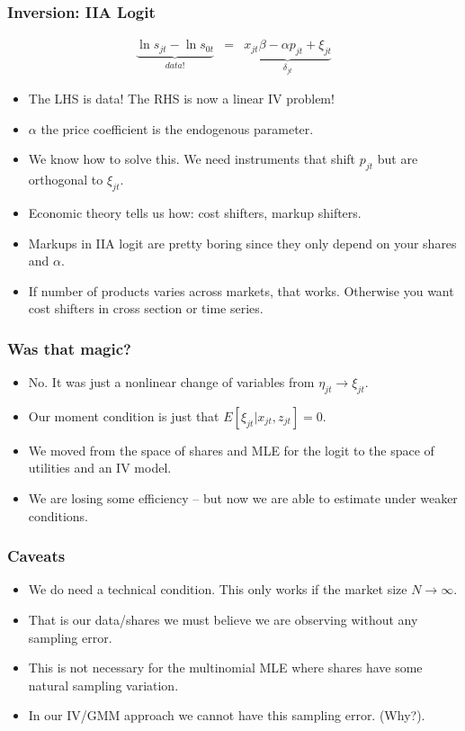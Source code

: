 \documentclass[xcolor=pdftex,dvipsnames,table,mathserif,aspectratio=169]{beamer}
\begin{document}
\begin{frame}
\frametitle{Inversion: IIA Logit}
\begin{eqnarray*}
\underbrace{\ln s_{jt}- \ln s_{0t}}_{data!}&=& \underbrace{x_{jt} \beta -\alpha p_{jt} +  \xi_{jt}}_{\delta_{jt}}
\end{eqnarray*}
 \begin{itemize}
\item The LHS is data! The RHS is now a linear IV problem!
\item $\alpha$ the price coefficient is the endogenous parameter.
\item We know how to solve this. We need instruments that shift $p_{jt}$ but are orthogonal to $\xi_{jt}$.
\item Economic theory tells us how: cost shifters, markup shifters.
\item Markups in IIA logit are pretty boring since they only depend on your shares and $\alpha$.
\item If number of products varies across markets, that works. Otherwise you want cost shifters in cross section or time series.
 \end{itemize}
\end{frame}


\begin{frame}
\frametitle{Was that magic?}
\begin{itemize}
\item No. It was just a nonlinear change of variables from $\eta_{jt} \rightarrow \xi_{jt}$.
\item Our moment condition is just that $E[\xi_{jt} | x_{jt}, z_{jt}]=0$.
\item We moved from the space of shares and MLE for the logit to the space of utilities and an IV model.
\item We are losing some efficiency -- but now we are able to estimate under weaker conditions.
 \end{itemize}
\end{frame}

\begin{frame}
\frametitle{Caveats}
\begin{itemize}
\item We do need a technical condition. This only works if the market size $N \rightarrow \infty$.
\item That is our data/shares we must believe we are observing without any sampling error.
\item This is not necessary for the multinomial MLE where shares have some natural sampling variation.
\item In our IV/GMM approach we cannot have this sampling error. (Why?).
 \end{itemize}
\end{frame}
\end{document}
